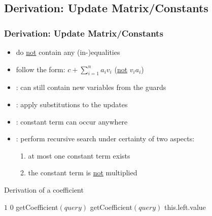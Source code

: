 \subsection{Derivation: Update Matrix/Constants}
\begin{frame}
	\frametitle{Derivation: Update Matrix/Constants}
	\begin{itemize}
		\item do \underline{not} contain any (in-)equalities
		\item follow the form: $c+\sum_{i=1}^{n}a_i v_i$ (\underline{not} $v_i a_i$)
		\item {}: can still contain new variables from the guards
		\item[] : apply substitutions to the updates
		\item {}: constant term can occur anywhere
		\item[] : perform recursive search under certainty of two aspects:
			\begin{enumerate}
				\item at most one constant term exists
				\item the constant term is \underline{not} multiplied
			\end{enumerate}
	\end{itemize}
\end{frame}

\begin{frame} %
	\begin{algorithm}[H]
		\caption{Derivation of a coefficient}
		\begin{algorithmic}[1]
			\State \Return $1$
			\State \Return $0$
			\EndIf
			\State
			\State \Return getCoefficient$(query)$
			\Else
			\State \Return getCoefficient$(query)$
			\EndIf
			\EndIf
			\State \Return this.left.value
			\EndIf				
			\EndIf
			\EndFunction
		\end{algorithmic}
	\end{algorithm}
\end{frame}


